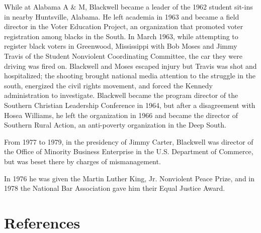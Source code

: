 While at Alabama A \& M, Blackwell became a leader of the 1962 student
sit-ins in nearby Huntsville, Alabama. He left academia in 1963 and
became a field director in the Voter Education Project, an organization
that promoted voter registration among blacks in the South. In March
1963, while attempting to register black voters in Greenwood,
Mississippi with Bob Moses and Jimmy Travis of the Student Nonviolent
Coordinating Committee, the car they were driving was fired on.
Blackwell and Moses escaped injury but Travis was shot and hospitalized;
the shooting brought national media attention to the struggle in the
south, energized the civil rights movement, and forced the Kennedy
administration to investigate. Blackwell became the program director of
the Southern Christian Leadership Conference in 1964, but after a
disagreement with Hosea Williams, he left the organization in 1966 and
became the director of Southern Rural Action, an anti-poverty
organization in the Deep South.

From 1977 to 1979, in the presidency of Jimmy Carter, Blackwell was
director of the Office of Minority Business Enterprise in the U.S.
Department of Commerce, but was beset there by charges of mismanagement.

In 1976 he was given the Martin Luther King, Jr. Nonviolent Peace Prize,
and in 1978 the National Bar Association gave him their Equal Justice
Award.

\section{References}\label{references}
